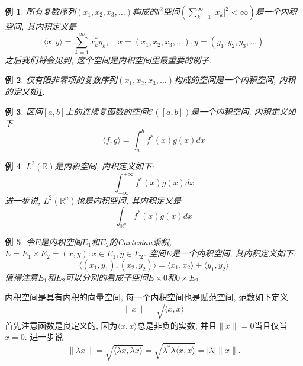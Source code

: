 \documentclass[a4paper,11pt]{book}
\newtheorem{example}{例}[section]
\begin{document}
\begin{example}\label{l^2 inner space}
  所有复数序列$(x_1,x_2,x_3,\dots)$构成的$l^2$空间$(\sum_{k=1}^{\infty}|x_k|^2<\infty)$是一个内积空间, 其内积定义是
  \begin{equation*}
    \langle x,y\rangle=\sum_{k=1}^{\infty}x_k^*y_k,\quad x=(x_1,x_2,x_3,\dots),y=(y_1,y_2,y_3,\dots)
  \end{equation*}
  之后我们将会见到, 这个空间是内积空间里最重要的例子.
\end{example}
\begin{example}\label{nonzero term}
  仅有限非零项的复数序列$(x_1,x_2,x_3,\dots)$构成的空间是一个内积空间, 内积的定义如\ref{l^2 inner space}.
\end{example}
\begin{example}\label{C[a,b]inner}
  区间$[a,b]$上的连续复函数的空间$\mathcal{C}([a,b])$是一个内积空间, 内积定义如下
  \begin{equation*}
    \langle f,g\rangle=\int_{a}^{b}f^*(x)g(x)dx
  \end{equation*}
\end{example}
\begin{example}
  $L^2(\mathbb{R})$是内积空间, 内积定义如下:
  \begin{equation*}
    \int_{-\infty}^{+\infty}f^*(x)g(x)dx
  \end{equation*}
  进一步说, $L^2(\mathbb{R}^n)$也是内积空间, 其内积定义是
  \begin{equation*}
    \int_{\mathbb{R}^n}f^*(x)g(x)dx
  \end{equation*}
\end{example}
\begin{example}
  令$E$是内积空间$E_1$和$E_2$的Cartesian乘积, $E=E_1\times E_2={(x,y):x\in E_1,y\in E_2}$. 空间$E$是一个内积空间, 其内积定义如下:
  \begin{equation*}
    \langle(x_1,y_1),(x_2,y_2)\rangle=\langle x_1,x_2\rangle+\langle y_1,y_2\rangle
  \end{equation*}
  值得注意$E_1$和$E_2$可以分别的看成子空间$E\times{0}$和${0}\times E_2$
\end{example}
内积空间是具有内积的向量空间, 每一个内积空间也是赋范空间, 范数如下定义
\begin{equation*}
  \|x\|=\sqrt{\langle x,x\rangle}
\end{equation*}
首先注意函数是良定义的, 因为$\langle x,x\rangle$总是非负的实数, 并且$\|x\|=0$当且仅当$x=0$. 进一步说
\begin{equation*}
  \|\lambda x\|=\sqrt{\langle\lambda x,\lambda x\rangle}=\sqrt{\lambda^*\lambda\langle x,x\rangle}=|\lambda|\|x\|.
\end{equation*}
\end{document}
